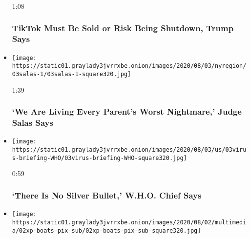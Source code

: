\begin{itemize}
  1:08

  \hypertarget{tiktok-must-be-sold-or-risk-being-shutdown-trump-says}{%
  \subsubsection{TikTok Must Be Sold or Risk Being Shutdown, Trump
  Says}\label{tiktok-must-be-sold-or-risk-being-shutdown-trump-says}}
\item
  \href{https://www.nytimes3xbfgragh.onion/video/us/100000007269993/judge-salas-new-jersey.html?action=click\&module=video-series-bar\&region=header\&pgtype=Article\&playlistId=video/latest-video}{}

  \texttt{[image: https://static01.graylady3jvrrxbe.onion/images/2020/08/03/nyregion/03salas-1/03salas-1-square320.jpg]}

  1:39

  \hypertarget{we-are-living-every-parents-worst-nightmare-judge-salas-says}{%
  \subsubsection{`We Are Living Every Parent's Worst Nightmare,' Judge
  Salas
  Says}\label{we-are-living-every-parents-worst-nightmare-judge-salas-says}}
\item
  \href{https://www.nytimes3xbfgragh.onion/video/world/europe/100000007269932/who-coronavirus-briefing.html?action=click\&module=video-series-bar\&region=header\&pgtype=Article\&playlistId=video/latest-video}{}

  \texttt{[image: https://static01.graylady3jvrrxbe.onion/images/2020/08/03/us/03virus-briefing-WHO/03virus-briefing-WHO-square320.jpg]}

  0:59

  \hypertarget{there-is-no-silver-bullet-who-chief-says}{%
  \subsubsection{`There Is No Silver Bullet,' W.H.O. Chief
  Says}\label{there-is-no-silver-bullet-who-chief-says}}
\item
  \href{https://www.nytimes3xbfgragh.onion/video/us/100000007269193/boats-circle-spacex-capsule.html?action=click\&module=video-series-bar\&region=header\&pgtype=Article\&playlistId=video/latest-video}{}

  \texttt{[image: https://static01.graylady3jvrrxbe.onion/images/2020/08/02/multimedia/02xp-boats-pix-sub/02xp-boats-pix-sub-square320.jpg]}


\end{itemize}
